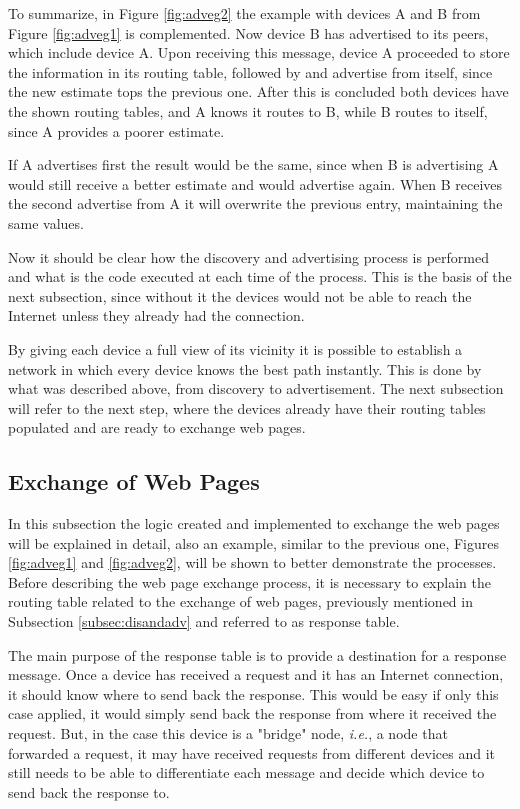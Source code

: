 To summarize, in Figure \ref{fig:adveg2} the example with devices A and B from Figure \ref{fig:adveg1} is complemented. Now device B has advertised to its peers, which include device A. Upon receiving this message, device A proceeded to store the information in its routing table, followed by and advertise from itself, since the new estimate tops the previous one. After this is concluded both devices have the shown routing tables, and A knows it routes to B, while B routes to itself, since A provides a poorer estimate.

If A advertises first the result would be the same, since when B is advertising A would still receive a better estimate and would advertise again. When B receives the second advertise from A it will overwrite the previous entry, maintaining the same values.

Now it should be clear how the discovery and advertising process is performed and what is the code executed at each time of the process. This is the basis of the next subsection, since without it the devices would not be able to reach the Internet unless they already had the connection.

By giving each device a full view of its vicinity it is possible to establish a network in which every device knows the best path instantly. This is done by what was described above, from discovery to advertisement. The next subsection will refer to the next step, where the devices already have their routing tables populated and are ready to exchange web pages. 

\subsection{Exchange of Web Pages}
\label{subsec:exch}

In this subsection the logic created and implemented to exchange the web pages will be explained in detail, also an example, similar to the previous one, Figures \ref{fig:adveg1} and \ref{fig:adveg2}, will be shown to better demonstrate the processes. Before describing the web page exchange process, it is necessary to explain the routing table related to the exchange of web pages, previously mentioned in Subsection \ref{subsec:disandadv} and referred to as response table.

The main purpose of the response table is to provide a destination for a response message. Once a device has received a request and it has an Internet connection, it should know where to send back the response. This would be easy if only this case applied, it would simply send back the response from where it received the request. But, in the case this device is a "bridge" node, \textit{i.e.}, a node that forwarded a request, it may have received requests from different devices and it still needs to be able to differentiate each message and decide which device to send back the response to.

